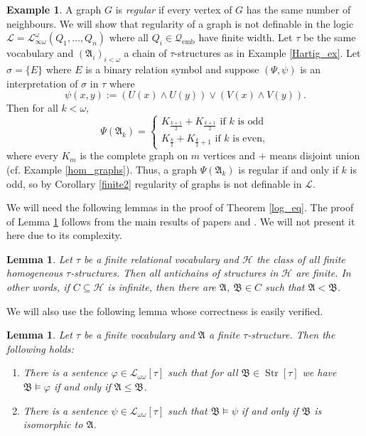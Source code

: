 \documentclass{ndjflart}
\theoremstyle{plain}
\newtheorem{lemma}[conjecture]{Lemma}
\theoremstyle{definition}
\newtheorem{example}[conjecture]{Example}
\numberwithin{equation}{section}
\DeclareMathOperator{\emb}{emb}
\DeclareMathOperator{\Str}{Str}
\begin{document}
\begin{example}\label{reg_graph_ex}
A graph $G$ is \emph{regular} if every vertex of $G$ has the same number of neighbours.
We will show that regularity of a graph is not definable in the logic
$\mathcal{L} = \mathcal{L}^{\omega}_{\infty \omega}(Q_1,\dots,Q_n)$ where all
$Q_i \in \mathcal{Q}_{\emb}$ have finite width.
Let $\tau$ be the same vocabulary and $(\mathfrak{A}_i)_{i<\omega}$ a chain of
$\tau$-structures as in Example \ref{Hartig_ex}.
Let $\sigma = \{E\}$ where $E$ is a binary relation symbol and suppose
$(\Psi,\psi)$ is an interpretation of $\sigma$ in $\tau$ where
\[
	\psi(x,y) := (U(x)\wedge U(y)) \vee (V(x) \wedge V(y)).
\]
Then for all $k<\omega$,
\[
	\Psi(\mathfrak{A}_k) = \begin{cases}
	K_{\frac{k+1}{2}} + K_{\frac{k+1}{2}} \text{ if } k \text{ is odd} \\
	K_{\frac{k}{2}} + K_{\frac{k}{2}+1} \text{ if } k \text{ is even},
	\end{cases}
\]
where every $K_m$ is the complete graph on $m$ vertices and $+$ means disjoint
union (cf. Example \ref{hom_graphs}).
Thus, a graph $\Psi(\mathfrak{A}_k)$ is regular if and only if $k$ is odd,
so by Corollary \ref{finite2} regularity of graphs is not definable in $\mathcal{L}$.
\end{example}

We will need the following lemmas in the proof of Theorem \ref{log_eq}.
The proof of Lemma \ref{shrinking} follows from the main results of papers
\cite{Cherlin:1986} and \cite{Lachlan:1984}. We will not present it here due to
its complexity.

\begin{lemma}\label{shrinking}
Let $\tau$ be a finite relational vocabulary and $\mathcal{H}$ the class of all
finite homogeneous $\tau$-structures.
Then all antichains of structures in $\mathcal{H}$ are finite.
In other words, if $C \subseteq \mathcal{H}$ is infinite, then there are
$\mathfrak{A}$, $\mathfrak{B} \in C$ such that $\mathfrak{A} < \mathfrak{B}$.
\end{lemma}

We will also use the following lemma whose correctness is easily verified.

\begin{lemma}\label{substr}
Let $\tau$ be a finite vocabulary and $\mathfrak{A}$ a finite $\tau$-structure.
Then the following holds:
\begin{enumerate}
\item There is a sentence $\varphi \in \mathcal{L}_{\omega\omega}[\tau]$ such
that for all $\mathfrak{B}\in \Str[\tau]$ we have
$\mathfrak{B} \vDash \varphi$ if and only if $\mathfrak{A} \leq \mathfrak{B}$.
\item There is a sentence $\psi \in \mathcal{L}_{\omega\omega}[\tau]$ such that
$\mathfrak{B} \vDash \psi$ if and only if $\mathfrak{B}$ is isomorphic to
$\mathfrak{A}$.
\end{enumerate}
\end{lemma}
\end{document}
